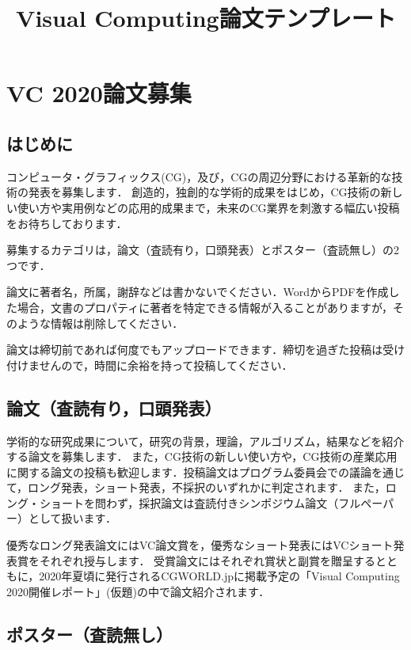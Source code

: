 \documentclass{vc}
\title{Visual Computing論文テンプレート}
\begin{document}
\maketitle

\section{VC 2020論文募集}

\subsection{はじめに}

コンピュータ・グラフィックス(CG)，及び，CGの周辺分野における革新的な技術の発表を募集します．
創造的，独創的な学術的成果をはじめ，CG技術の新しい使い方や実用例などの応用的成果まで，未来のCG業界を刺激する幅広い投稿をお待ちしております．

募集するカテゴリは，論文（査読有り，口頭発表）とポスター（査読無し）の2つです．

論文に著者名，所属，謝辞などは書かないでください．WordからPDFを作成した場合，文書のプロパティに著者を特定できる情報が入ることがありますが，そのような情報は削除してください．

論文は締切前であれば何度でもアップロードできます．締切を過ぎた投稿は受け付けませんので，時間に余裕を持って投稿してください．

\subsection{論文（査読有り，口頭発表）}

学術的な研究成果について，研究の背景，理論，アルゴリズム，結果などを紹介する論文を募集します． また，CG技術の新しい使い方や，CG技術の産業応用に関する論文の投稿も歓迎します．投稿論文はプログラム委員会での議論を通じて，ロング発表，ショート発表，不採択のいずれかに判定されます．
また，ロング・ショートを問わず，採択論文は査読付きシンポジウム論文（フルペーパー）として扱います．

優秀なロング発表論文にはVC論文賞を，優秀なショート発表にはVCショート発表賞をそれぞれ授与します． 受賞論文にはそれぞれ賞状と副賞を贈呈するとともに，2020年夏頃に発行されるCGWORLD.jpに掲載予定の「Visual Computing 2020開催レポート」(仮題)の中で論文紹介されます．

\subsection{ポスター（査読無し）}
\end{document}
